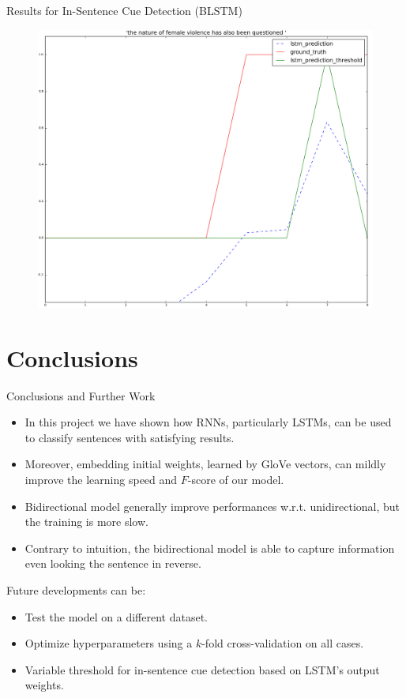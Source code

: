 \documentclass{beamer}
\begin{document}
\begin{frame}{Results for In-Sentence Cue Detection (BLSTM)}
	\begin{figure}[htbp]
		\includegraphics[scale=0.3]{images/task2_2dir/73_type1}
	\end{figure}
\end{frame}

\section{Conclusions}
\begin{frame}{Conclusions and Further Work}
	\begin{itemize}%
		\item In this project we have shown how RNNs, particularly LSTMs, can be used to classify sentences with satisfying results.	
		\item Moreover, embedding initial weights, learned by GloVe vectors, can mildly improve the learning speed and $F$-score of our model.
		\item Bidirectional model generally improve performances w.r.t. unidirectional, but the training is more slow.
		\item Contrary to intuition, the bidirectional model is able to capture information even looking the sentence in reverse. 
	\end{itemize}
	Future developments can be:
	\begin{itemize}
		\item Test the model on a different dataset.
		\item Optimize hyperparameters using a $k$-fold cross-validation on all cases.
		\item Variable threshold for in-sentence cue detection based on LSTM's output weights.
	\end{itemize}
\end{frame}

	
\end{document}
